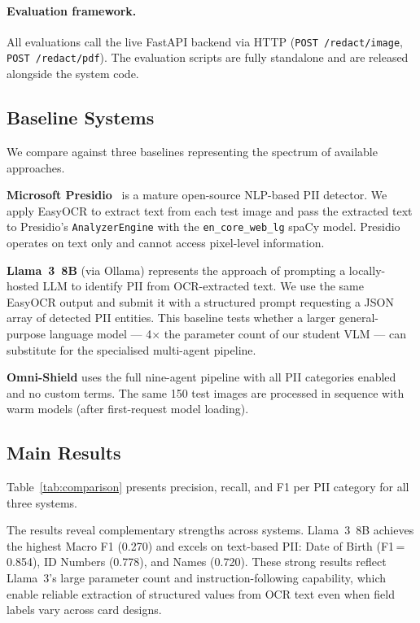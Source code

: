 \paragraph{Evaluation framework.}
All evaluations call the live FastAPI backend via
HTTP (\texttt{POST /redact/image},
\texttt{POST /redact/pdf}).
The evaluation scripts are fully standalone and
are released alongside the system code.

\subsection{Baseline Systems}

We compare against three baselines representing
the spectrum of available approaches.

\textbf{Microsoft Presidio}~\cite{presidio2020}
is a mature open-source NLP-based PII detector.
We apply EasyOCR to extract text from each test
image and pass the extracted text to Presidio's
\texttt{AnalyzerEngine} with the
\texttt{en\_core\_web\_lg} spaCy model.
Presidio operates on text only and cannot access
pixel-level information.

\textbf{Llama~3~8B} (via Ollama) represents the
approach of prompting a locally-hosted LLM to
identify PII from OCR-extracted text.
We use the same EasyOCR output and submit it with
a structured prompt requesting a JSON array of
detected PII entities.
This baseline tests whether a larger general-purpose
language model --- 4$\times$ the parameter count of
our student VLM --- can substitute for the
specialised multi-agent pipeline.

\textbf{Omni-Shield} uses the full nine-agent
pipeline with all PII categories enabled and no
custom terms.
The same 150 test images are processed in sequence
with warm models (after first-request model loading).

\subsection{Main Results}



Table~\ref{tab:comparison} presents precision,
recall, and F1 per PII category for all three
systems.

The results reveal complementary strengths across
systems.
Llama~3~8B achieves the highest Macro F1 (0.270)
and excels on text-based PII: Date of Birth
(F1\,=\,0.854), ID Numbers (0.778), and Names
(0.720).
These strong results reflect Llama~3's large
parameter count and instruction-following capability,
which enable reliable extraction of structured
values from OCR text even when field labels vary
across card designs.

